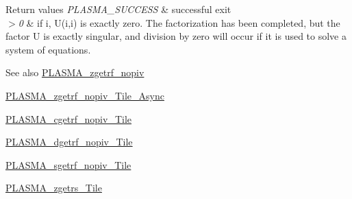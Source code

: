 \begin{DoxyRetVals}{Return values}
{\em P\+L\+A\+S\+M\+A\+\_\+\+S\+U\+C\+C\+E\+S\+S} & successful exit \\
\hline
{\em $>$0} & if i, U(i,i) is exactly zero. The factorization has been completed, but the factor U is exactly singular, and division by zero will occur if it is used to solve a system of equations.\\
\hline
\end{DoxyRetVals}
\begin{DoxySeeAlso}{See also}
\hyperlink{group__PLASMA__Complex64__t_ga6fddd4132db9c55950061ff61f1e00e0_ga6fddd4132db9c55950061ff61f1e00e0}{P\+L\+A\+S\+M\+A\+\_\+zgetrf\+\_\+nopiv} 

\hyperlink{group__PLASMA__Complex64__t__Tile__Async_gae0d785e8c60e02a21697f60cd1cef5fc_gae0d785e8c60e02a21697f60cd1cef5fc}{P\+L\+A\+S\+M\+A\+\_\+zgetrf\+\_\+nopiv\+\_\+\+Tile\+\_\+\+Async} 

\hyperlink{group__PLASMA__Complex32__t__Tile_ga126202c0c0ffa1f033b8b1bc65254595_ga126202c0c0ffa1f033b8b1bc65254595}{P\+L\+A\+S\+M\+A\+\_\+cgetrf\+\_\+nopiv\+\_\+\+Tile} 

\hyperlink{group__double__Tile_ga7a0926d28d13b960d7c22159ac347248_ga7a0926d28d13b960d7c22159ac347248}{P\+L\+A\+S\+M\+A\+\_\+dgetrf\+\_\+nopiv\+\_\+\+Tile} 

\hyperlink{group__float__Tile_gac69f83430a75ebaad0d19442761004b6_gac69f83430a75ebaad0d19442761004b6}{P\+L\+A\+S\+M\+A\+\_\+sgetrf\+\_\+nopiv\+\_\+\+Tile} 

\hyperlink{group__PLASMA__Complex64__t__Tile_ga143e5ed5a42b9fa3ae76b4df3258d071_ga143e5ed5a42b9fa3ae76b4df3258d071}{P\+L\+A\+S\+M\+A\+\_\+zgetrs\+\_\+\+Tile} 
\end{DoxySeeAlso}
\hypertarget{group__PLASMA__Complex64__t__Tile_gabaabd34550ca8a2ba83245af3c44bea0_gabaabd34550ca8a2ba83245af3c44bea0}{}
